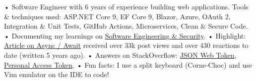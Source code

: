 

\begin{cvparagraph}

• Software Engineer with 6 years of experience building web applications. Tools \& techniques used: ASP.NET Core 9, EF Core 9, Blazor, Azure, OAuth 2, Integration \& Unit Tests, GitHub Actions, Microservices, Clean \& Secure Code.
\newline
• Documenting my learnings on \href{https://bit.ly/zy-blog}{Software Engineering \& Security}.
\newline
• Highlight: \href{https://bit.ly/zy-async}{Article on Async / Await} received over 33k post views and over 430 reactions to date (written 5 years ago).
\newline
• Answers on StackOverflow: \href{https://bit.ly/zy-jwt}{JSON Web Token}, \href{https://bit.ly/zy-pat}{Personal Access Token}.
\newline
• Fun facts: I use a split keyboard (Corne-Choc) and use Vim emulator on the IDE to code!
\end{cvparagraph}